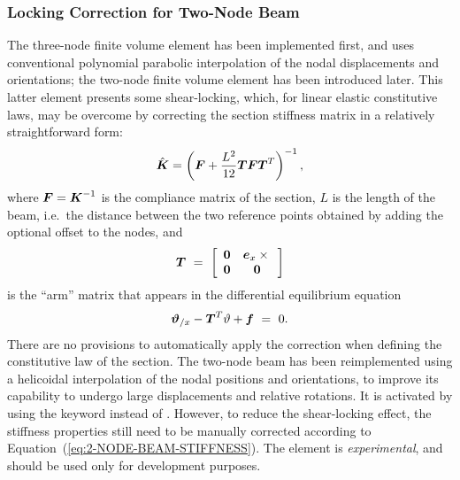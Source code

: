 \subsubsection{Locking Correction for Two-Node Beam}
The three-node finite volume element has been implemented first, 
and uses conventional polynomial parabolic interpolation 
of the nodal displacements and orientations;
the two-node finite volume element has been introduced later.
This latter element presents some shear-locking, which, for linear elastic
constitutive laws, may be overcome by correcting the section stiffness matrix
in a relatively straightforward form:
\begin{equation}\label{eq:2-NODE-BEAM-STIFFNESS}
	\hat{\T{K}} = \plbr{\T{F} + \frac{L^2}{12}\T{T} \T{F} \T{T}^T}^{-1} ,
\end{equation}
where $\T{F}=\T{K}^{-1}$ is the compliance matrix of the section, 
$L$ is the length of the beam, i.e.\ the distance between
the two reference points obtained by adding the optional offset 
to the nodes, and
\begin{displaymath}
	\T{T} \ = \ \sqbr{\matr{cc}{
		\T{0} & \T{e}_x \times{} \\
		\T{0} & \T{0}
	}}
\end{displaymath}
is the ``arm'' matrix that appears in the differential equilibrium equation
\begin{displaymath}
	\T{\vartheta}_{/x} - \T{T}^T\vartheta + \T{f} \ = \ 0 .
\end{displaymath}
There are no provisions to automatically apply the correction 
when defining the constitutive law of the section.
The two-node beam has been reimplemented using a helicoidal interpolation
of the nodal positions and orientations, to improve its capability
to undergo large displacements and relative rotations.
It is activated by using the keyword  instead of .
However, to reduce the shear-locking effect, the stiffness properties 
still need to be manually corrected according
to Equation~(\ref{eq:2-NODE-BEAM-STIFFNESS}).
The  element is \emph{experimental}, and should be used
only for development purposes.


